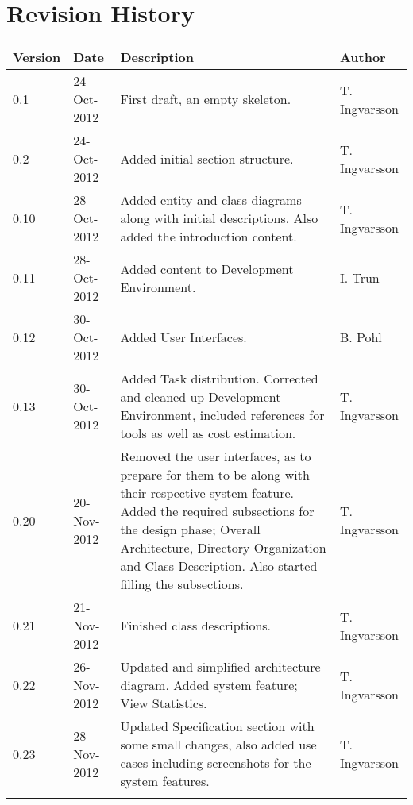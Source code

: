 \section*{Revision History}
\begin{center}
    \begin{tabularx}{\linewidth}{ | l | l | X | l |}
    \hline
    Version & Date & Description & Author\\ \hline
    0.1 & 24-Oct-2012 & First draft, an empty skeleton. & T. Ingvarsson\\ \hline
    0.2 & 24-Oct-2012 & Added initial section structure. & T. Ingvarsson\\ \hline
    0.10 & 28-Oct-2012 & Added entity and class diagrams along with initial descriptions. Also added the introduction content. & T. Ingvarsson\\ \hline
    0.11 & 28-Oct-2012 & Added content to Development Environment. & I. Trun\\ \hline
    0.12 & 30-Oct-2012 & Added User Interfaces. & B. Pohl\\ \hline
    0.13 & 30-Oct-2012 & Added Task distribution. Corrected and cleaned up Development Environment, included references for tools as well as cost estimation. & T. Ingvarsson\\ \hline
    0.20 & 20-Nov-2012 & Removed the user interfaces, as to prepare for them to be along with their respective system feature. Added the required subsections for the design phase; Overall Architecture, Directory Organization and Class Description. Also started filling the subsections. & T. Ingvarsson\\ \hline
    0.21 & 21-Nov-2012 & Finished class descriptions. & T. Ingvarsson\\ \hline
    0.22 & 26-Nov-2012 & Updated and simplified architecture diagram. Added system feature; View Statistics. & T. Ingvarsson\\ \hline
    0.23 & 28-Nov-2012 & Updated Specification section with some small changes, also added use cases including screenshots for the system features. & T. Ingvarsson\\ \hline
     & & & \\ \hline
    \end{tabularx}
    
\end{center}